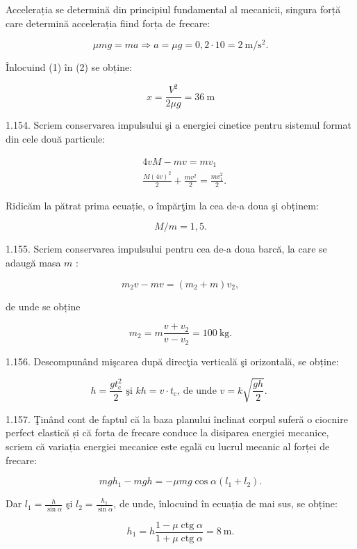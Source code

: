 \documentclass[10pt]{article}
\begin{document}
Accelerația se determină din principiul fundamental al mecanicii, singura forță care determină accelerația fiind forța de frecare:

$$
\mu m g=m a \Rightarrow a=\mu g=0,2 \cdot 10=2 \mathrm{~m} / \mathrm{s}^{2} .
$$

Înlocuind (1) în (2) se obține:

$$
x=\frac{V^{2}}{2 \mu g}=36 \mathrm{~m}
$$

1.154. Scriem conservarea impulsului şi a energiei cinetice pentru sistemul format din cele două particule:

$$
\begin{aligned}
& 4 v M-m v=m v_{1} \\
& \frac{M(4 v)^{2}}{2}+\frac{m v^{2}}{2}=\frac{m v_{1}^{2}}{2} .
\end{aligned}
$$

Ridicăm la pătrat prima ecuație, o împărţim la cea de-a doua şi obținem:

$$
M / m=1,5 .
$$

1.155. Scriem conservarea impulsului pentru cea de-a doua barcă, la care se adaugă masa $m$ :

$$
m_{2} v-m v=\left(m_{2}+m\right) v_{2},
$$

de unde se obține

$$
m_{2}=m \frac{v+v_{2}}{v-v_{2}}=100 \mathrm{~kg} .
$$

1.156. Descompunând mişcarea după direcţia verticală şi orizontală, se obține:

$$
h=\frac{g t_{\mathrm{c}}^{2}}{2} \text { şi } k h=v \cdot t_{\mathrm{c}} \text {, de unde } v=k \sqrt{\frac{g h}{2}} \text {. }
$$

1.157. Ţinând cont de faptul că la baza planului înclinat corpul suferă o ciocnire perfect elastică și că forta de frecare conduce la disiparea energiei mecanice, scriem că variația energiei mecanice este egală cu lucrul mecanic al forței de frecare:

$$
m g h_{1}-m g h=-\mu m g \cos \alpha\left(l_{1}+l_{2}\right) .
$$

Dar $l_{1}=\frac{h}{\sin \alpha}$ şi $l_{2}=\frac{h_{1}}{\sin \alpha}$, de unde, înlocuind în ecuația de mai sus, se obține:

$$
h_{1}=h \frac{1-\mu \operatorname{ctg} \alpha}{1+\mu \operatorname{ctg} \alpha}=8 \mathrm{~m} .
$$
\end{document}
